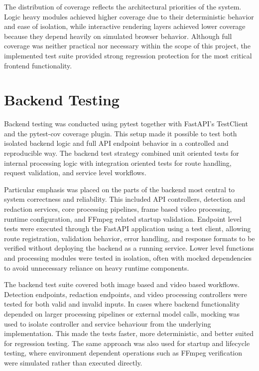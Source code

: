 The distribution of coverage reflects the architectural priorities of the system. Logic heavy modules achieved higher coverage due to their deterministic behavior and ease of isolation, while interactive rendering layers achieved lower coverage because they depend heavily on simulated browser behavior. Although full coverage was neither practical nor necessary within the scope of this project, the implemented test suite provided strong regression protection for the most critical frontend functionality.


\section{Backend Testing}

Backend testing was conducted using pytest together with FastAPI's TestClient and the pytest-cov coverage plugin. This setup made it possible to test both isolated backend logic and full API endpoint behavior in a controlled and reproducible way. The backend test strategy combined unit oriented tests for internal processing logic with integration oriented tests for route handling, request validation, and service level workflows.

Particular emphasis was placed on the parts of the backend most central to system correctness and reliability. This included API controllers, detection and redaction services, core processing pipelines, frame based video processing, runtime configuration, and FFmpeg related startup validation. Endpoint level tests were executed through the FastAPI application using a test client, allowing route registration, validation behavior, error handling, and response formats to be verified without deploying the backend as a running service. Lower level functions and processing modules were tested in isolation, often with mocked dependencies to avoid unnecessary reliance on heavy runtime components.

The backend test suite covered both image based and video based workflows. Detection endpoints, redaction endpoints, and video processing controllers were tested for both valid and invalid inputs. In cases where backend functionality depended on larger processing pipelines or external model calls, mocking was used to isolate controller and service behaviour from the underlying implementation. This made the tests faster, more deterministic, and better suited for regression testing. The same approach was also used for startup and lifecycle testing, where environment dependent operations such as FFmpeg verification were simulated rather than executed directly.

